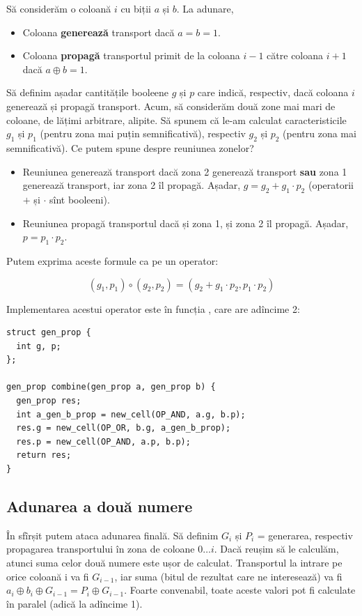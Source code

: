 Să considerăm o coloană $i$ cu biții $a$ și $b$. La adunare,

\begin{itemize}
  \item Coloana \textbf{generează} transport dacă $a = b = 1$.

  \item Coloana \textbf{propagă} transportul primit de la coloana $i-1$ către coloana $i+1$ dacă $a \oplus b = 1$.
\end{itemize}

Să definim așadar cantitățile booleene $g$ și $p$ care indică, respectiv, dacă coloana $i$ generează și propagă transport. Acum, să considerăm două zone mai mari de coloane, de lățimi arbitrare, alipite. Să spunem că le-am calculat caracteristicile $g_1$ și $p_1$ (pentru zona mai puțin semnificativă), respectiv $g_2$ și $p_2$ (pentru zona mai semnificativă). Ce putem spune despre reuniunea zonelor?

\begin{itemize}
  \item Reuniunea generează transport dacă zona 2 generează transport \textbf{sau} zona 1 generează transport, iar zona 2 îl propagă. Așadar, $g = g_2 + g_1 \cdot p_2$ (operatorii $+$ și $\cdot$ sînt booleeni).

  \item Reuniunea propagă transportul dacă și zona 1, și zona 2 îl propagă. Așadar, $p = p_1 \cdot p_2$.
\end{itemize}

Putem exprima aceste formule ca pe un operator:

$$(g_1, p_1) \circ (g_2, p_2) = (g_2 + g_1 \cdot p_2, p_1 \cdot p_2)$$

Implementarea acestui operator este în funcția , care are adîncime 2:

\begin{verbatim}
struct gen_prop {
  int g, p;
};

gen_prop combine(gen_prop a, gen_prop b) {
  gen_prop res;
  int a_gen_b_prop = new_cell(OP_AND, a.g, b.p);
  res.g = new_cell(OP_OR, b.g, a_gen_b_prop);
  res.p = new_cell(OP_AND, a.p, b.p);
  return res;
}
\end{verbatim}

\subsection{Adunarea a două numere}

În sfîrșit putem ataca adunarea finală. Să definim $G_i$ și $P_i$ = generarea, respectiv propagarea transportului în zona de coloane $0 \dots i$. Dacă reușim să le calculăm, atunci suma celor două numere este ușor de calculat. Transportul la intrare pe orice coloană i va fi $G_{i-1}$, iar suma (bitul de rezultat care ne interesează) va fi $a_i \oplus b_i \oplus G_{i-1} = P_i \oplus G_{i-1}$. Foarte convenabil, toate aceste valori pot fi calculate în paralel (adică la adîncime 1).

